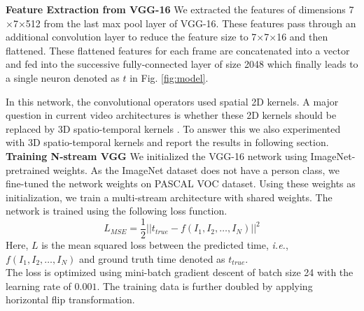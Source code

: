 \textbf{Feature Extraction from VGG-16} We extracted the features of dimensions  7$\times$7$\times$512 from the last max pool layer of VGG-16. These features pass through an additional convolution layer to reduce the feature size to 7$\times$7$\times$16 and then flattened. These flattened features for each frame are concatenated into a vector and fed into the successive fully-connected layer of size 2048 which finally leads to a single neuron denoted as $t$ in Fig. \ref{fig:model}.  

In this network, the convolutional operators used spatial 2D kernels. A major question in current video architectures is whether these 2D kernels should be replaced by 3D spatio-temporal kernels \cite{i3d}. To answer this we also experimented with 3D spatio-temporal kernels and report the results in following section. \\

\textbf{Training N-stream VGG} We initialized the VGG-16 network using ImageNet-pretrained weights. As the ImageNet dataset does not have a person class, we fine-tuned the network weights on PASCAL VOC \cite{pascalVOC} dataset. Using these weights as initialization, we train a multi-stream architecture with shared weights. The network is trained using the following loss function.
$$
L_{MSE} = \frac{1}{2}||t_{true} - f(I_1, I_2, \hdots, I_N)||^{2}
$$
Here, $L$ is the mean squared loss between the predicted time, \emph{i.e.}, $f(I_1, I_2, \hdots, I_N)$ and ground truth time denoted as $t_{true}$. \\
The loss is optimized using mini-batch gradient descent of batch size 24 with the learning rate of $0.001$. The training data is further doubled by applying horizontal flip transformation.

